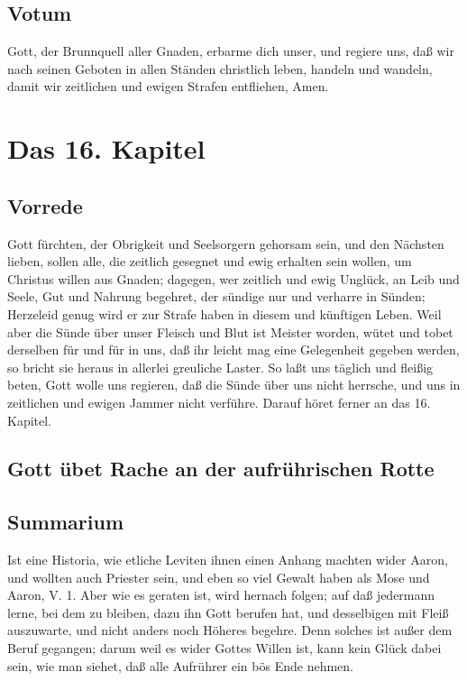 \section{Votum}

Gott, der Brunnquell aller Gnaden, erbarme dich unser, und regiere uns, daß wir nach seinen Geboten in allen Ständen christlich leben, handeln und wandeln, damit wir zeitlichen und ewigen Strafen entfliehen, Amen.

\chapter{Das 16. Kapitel}

\section{Vorrede}

Gott fürchten, der Obrigkeit und Seelsorgern gehorsam sein, und den Nächsten lieben, sollen alle, die zeitlich gesegnet und ewig erhalten sein wollen, um Christus willen aus Gnaden; dagegen, wer zeitlich und ewig Unglück, an Leib und Seele, Gut und Nahrung begehret, der sündige nur und verharre in Sünden; Herzeleid genug wird er zur Strafe haben in diesem und künftigen Leben. Weil aber die Sünde über unser Fleisch und Blut ist Meister worden, wütet und tobet derselben für und für in uns, daß ihr leicht mag eine Gelegenheit gegeben werden, so bricht sie heraus in allerlei greuliche Laster. So laßt uns täglich und fleißig beten, Gott wolle uns regieren, daß die Sünde über uns nicht herrsche, und uns in zeitlichen und ewigen Jammer nicht verführe. Darauf höret ferner an das 16. Kapitel.

\section{Gott übet Rache an der aufrührischen Rotte}

\section{Summarium}

Ist eine Historia, wie etliche Leviten ihnen einen Anhang machten wider Aaron, und wollten auch Priester sein, und eben so viel Gewalt haben als Mose und Aaron, V. 1. Aber wie es geraten ist, wird hernach folgen; auf daß jedermann lerne, bei dem zu bleiben, dazu ihn Gott berufen hat, und desselbigen mit Fleiß auszuwarte, und nicht anders noch Höheres begehre. Denn solches ist außer dem Beruf gegangen; darum weil es wider Gottes Willen ist, kann kein Glück dabei sein, wie man siehet, daß alle Aufrührer ein bös Ende nehmen.

